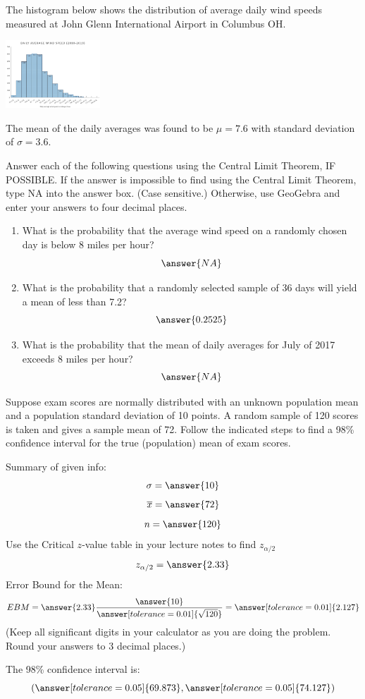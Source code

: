 \documentclass{ximera}
\begin{document}
\begin{problem}\label{prob:140hom6prob3}
The histogram below shows the distribution of average daily wind speeds measured at John Glenn International Airport in Columbus OH.
\begin{image}
   \includegraphics[height=1in]{140H6pic1.jpg}
 \end{image}
 The mean of the daily averages was found to be $\mu=7.6$ with standard deviation of $\sigma=3.6$.
 
 Answer each of the following questions using the Central Limit Theorem, IF POSSIBLE.  If the answer is impossible to find using the Central Limit Theorem, type NA into the answer box. (Case sensitive.)  Otherwise, use GeoGebra and enter your answers to four decimal places.
 \begin{enumerate}
     \item What is the probability that the average wind speed on a randomly chosen day is below 8 miles per hour?
     $$\answer{NA}$$
     \item What is the probability that a randomly selected sample of 36 days will yield a mean of less than 7.2?
     $$\answer{0.2525}$$
     \item What is the probability that the mean of daily averages for July of 2017 exceeds 8 miles per hour?
     $$\answer{NA}$$
     
 \end{enumerate}
\end{problem}
 
\begin{problem}\label{prob:140hom6prob4}
Suppose exam scores are normally distributed with an unknown population mean and a population standard deviation of 10 points. A random sample of 120 scores is taken and gives a sample mean of 72. Follow the indicated steps to find a 98\% confidence interval for the true (population) mean of exam scores.

Summary of given info:
$$\sigma=\answer{10}$$
$$\overline{x}=\answer{72}$$
$$n=\answer{120}$$
Use the Critical $z$-value table in your lecture notes to find $z_{\alpha/2}$
$$z_{\alpha/2}=\answer{2.33}$$
Error Bound for the Mean:
$$EBM=\answer{2.33}\frac{\answer{10}}{\answer[tolerance=0.01]{\sqrt{120}}}=\answer[tolerance=0.01]{2.127}$$
(Keep all significant digits in your calculator as you are doing the problem.  Round your answers to 3 decimal places.)

The 98\% confidence interval is:
$$(\answer[tolerance=0.05]{69.873},\answer[tolerance=0.05]{74.127})$$
\end{problem}
\end{document}
